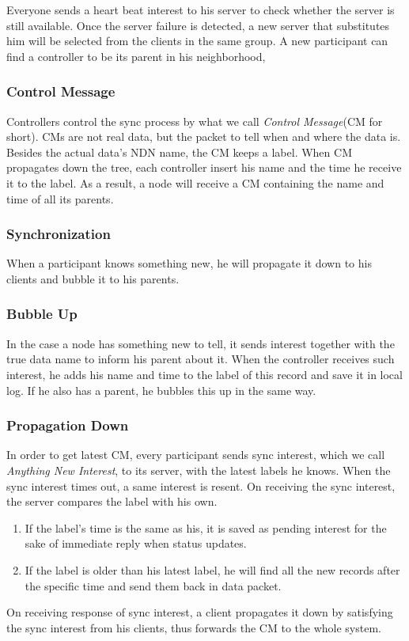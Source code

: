\documentclass[conference]{IEEEtran}
\begin{document}
Everyone sends a heart beat interest to his server to check whether the server is still available.
Once the server failure is detected,
a new server that substitutes him will be selected from the clients in the same group.
A new participant can find a controller to be its parent in his neighborhood,

\subsubsection{Control Message}
Controllers control the sync process by what we call \emph{Control Message}(CM for short).
CMs are not real data, but the packet to tell when and where the data is.
Besides the actual data's NDN name, the CM keeps a label.
When CM propagates down the tree,
each controller insert his name and the time he receive it to the label.
As a result, a node will receive a CM containing the name and time of all its parents.

\subsubsection{Synchronization}
When a participant knows something new,
he will propagate it down to his clients and bubble it to his parents.

\subsubsection{Bubble Up}
In the case a node has something new to tell,
it sends interest together with the true data name to inform his parent about it.
When the controller receives such interest,
he adds his name and time to the label of this record and save it in local log.
If he also has a parent, he bubbles this up in the same way.

\subsubsection{Propagation Down}
In order to get latest CM,
every participant sends sync interest, which we call \emph{Anything New Interest},
to its server, with the latest labels he knows.
When the sync interest times out, a same interest is resent.
On receiving the sync interest, the server compares the label with his own.
\begin{enumerate}{}
	\item If the label's time is the same as his,
it is saved as pending interest for the sake of immediate reply when status updates.
	\item If the label is older than his latest label,
he will find all the new records after the specific time and send them back in data packet.
\end{enumerate}
On receiving response of sync interest,
a client propagates it down by satisfying the sync interest from his clients,
thus forwards the CM to the whole system.
\end{document}
